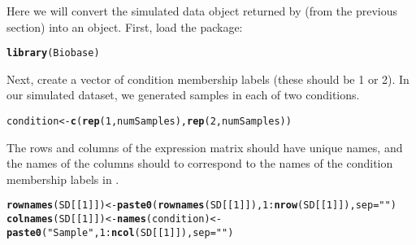 \documentclass{article}\usepackage[]{graphicx}\usepackage[]{color}
\makeatletter
\newcommand{\hlnum}[1]{\textcolor[rgb]{0.686,0.059,0.569}{#1}}%
\newcommand{\hlstr}[1]{\textcolor[rgb]{0.192,0.494,0.8}{#1}}%
\newcommand{\hlopt}[1]{\textcolor[rgb]{0,0,0}{#1}}%
\newcommand{\hlstd}[1]{\textcolor[rgb]{0.345,0.345,0.345}{#1}}%
\newcommand{\hlkwb}[1]{\textcolor[rgb]{0.69,0.353,0.396}{#1}}%
\newcommand{\hlkwc}[1]{\textcolor[rgb]{0.333,0.667,0.333}{#1}}%
\newcommand{\hlkwd}[1]{\textcolor[rgb]{0.737,0.353,0.396}{\textbf{#1}}}%
\newenvironment{kframe}{%
 \def\at@end@of@kframe{}%
 \ifinner\ifhmode%
  \def\at@end@of@kframe{\end{minipage}}%
  \begin{minipage}{\columnwidth}%
 \fi\fi%
 \def\FrameCommand##1{\hskip\@totalleftmargin \hskip-\fboxsep
 \colorbox{shadecolor}{##1}\hskip-\fboxsep
     \hskip-\linewidth \hskip-\@totalleftmargin \hskip\columnwidth}%
 \MakeFramed {\advance\hsize-\width
   \@totalleftmargin\z@ \linewidth\hsize
   \@setminipage}}%
 {\par\unskip\endMakeFramed%
 \at@end@of@kframe}
\newenvironment{knitrout}{}{} %
\makeatother
\begin{document}
Here we will convert the simulated data object  returned by  (from the previous section) into an  object. First, load the  package:

\begin{knitrout}
\color{fgcolor}\begin{kframe}
\begin{alltt}
\hlkwd{library}\hlstd{(Biobase)}
\end{alltt}
\end{kframe}
\end{knitrout}

Next, create a vector of condition membership labels (these should be 1 or 2).  In our simulated dataset, we generated  samples in each of two conditions.

\begin{knitrout}
\color{fgcolor}\begin{kframe}
\begin{alltt}
\hlstd{condition} \hlkwb{<-} \hlkwd{c}\hlstd{(}\hlkwd{rep}\hlstd{(}\hlnum{1}\hlstd{, numSamples),} \hlkwd{rep}\hlstd{(}\hlnum{2}\hlstd{, numSamples))}
\end{alltt}
\end{kframe}
\end{knitrout}

The rows and columns of the expression matrix should have unique names, and the names of the columns should to correspond to the names of the condition membership labels in .

\begin{knitrout}
\color{fgcolor}\begin{kframe}
\begin{alltt}
\hlkwd{rownames}\hlstd{(SD[[}\hlnum{1}\hlstd{]])} \hlkwb{<-} \hlkwd{paste0}\hlstd{(}\hlkwd{rownames}\hlstd{(SD[[}\hlnum{1}\hlstd{]]),} \hlnum{1}\hlopt{:}\hlkwd{nrow}\hlstd{(SD[[}\hlnum{1}\hlstd{]]),} \hlkwc{sep}\hlstd{=}\hlstr{""}\hlstd{)}
\hlkwd{colnames}\hlstd{(SD[[}\hlnum{1}\hlstd{]])} \hlkwb{<-} \hlkwd{names}\hlstd{(condition)} \hlkwb{<-} \hlkwd{paste0}\hlstd{(}\hlstr{"Sample"}\hlstd{,} \hlnum{1}\hlopt{:}\hlkwd{ncol}\hlstd{(SD[[}\hlnum{1}\hlstd{]]),} \hlkwc{sep}\hlstd{=}\hlstr{""}\hlstd{)}
\end{alltt}
\end{kframe}
\end{knitrout}
\end{document}
